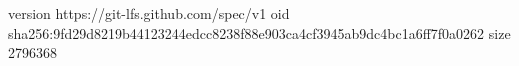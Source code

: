 version https://git-lfs.github.com/spec/v1
oid sha256:9fd29d8219b44123244edcc8238f88e903ca4cf3945ab9dc4bc1a6ff7f0a0262
size 2796368
